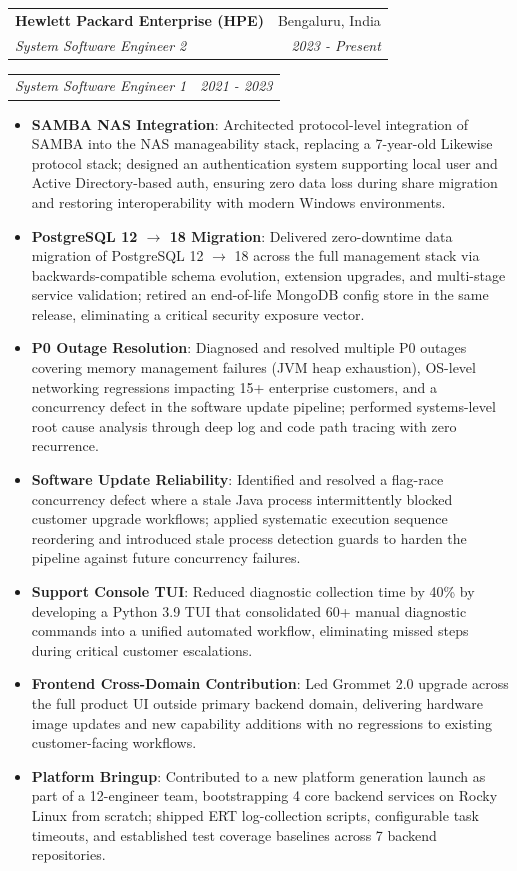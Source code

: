 \documentclass[letterpaper,10pt]{article}
\makeatletter
\newcommand{\resumeItem}[2]{
  \item\small{
    \textbf{#1}{: #2 \vspace{-2pt}}
  }
}
\newcommand{\resumeSubheading}[4]{
  \vspace{-1pt}\item
    \begin{tabular*}{0.97\textwidth}[t]{l@{\extracolsep{\fill}}r}
      \textbf{#1} & \small #2 \\
      \textit{\small #3} & \textit{\small #4} \\
    \end{tabular*}\vspace{-5pt}
}
\newcommand{\resumeSubSubheading}[2]{
    \begin{tabular*}{0.97\textwidth}{l@{\extracolsep{\fill}}r}
      \textit{\small #1} & \textit{\small #2} \\
    \end{tabular*}\vspace{-5pt}
}
\newcommand{\resumeItemListStart}{\begin{itemize}[itemsep=1pt]}
\newcommand{\resumeItemListEnd}{\end{itemize}\vspace{-3pt}}
\makeatother
\begin{document}
    \resumeSubheading
      {Hewlett Packard Enterprise (HPE)}{Bengaluru, India}
      {System Software Engineer 2}{2023 - Present}
    \resumeSubSubheading
      {System Software Engineer 1}{2021 - 2023}
      \resumeItemListStart
        \resumeItem{SAMBA NAS Integration}
          {Architected protocol-level integration of SAMBA into the NAS manageability stack, replacing a 7-year-old Likewise protocol stack; designed an authentication system supporting local user and Active Directory-based auth, ensuring zero data loss during share migration and restoring interoperability with modern Windows environments.}
        \resumeItem{PostgreSQL 12 $\rightarrow$ 18 Migration}
          {Delivered zero-downtime data migration of PostgreSQL 12 $\rightarrow$ 18 across the full management stack via backwards-compatible schema evolution, extension upgrades, and multi-stage service validation; retired an end-of-life MongoDB config store in the same release, eliminating a critical security exposure vector.}
        \resumeItem{P0 Outage Resolution}
          {Diagnosed and resolved multiple P0 outages covering memory management failures (JVM heap exhaustion), OS-level networking regressions impacting 15+ enterprise customers, and a concurrency defect in the software update pipeline; performed systems-level root cause analysis through deep log and code path tracing with zero recurrence.}
        \resumeItem{Software Update Reliability}
          {Identified and resolved a flag-race concurrency defect where a stale Java process intermittently blocked customer upgrade workflows; applied systematic execution sequence reordering and introduced stale process detection guards to harden the pipeline against future concurrency failures.}
        \resumeItem{Support Console TUI}
          {Reduced diagnostic collection time by 40\% by developing a Python 3.9 TUI that consolidated 60+ manual diagnostic commands into a unified automated workflow, eliminating missed steps during critical customer escalations.}
        \resumeItem{Frontend Cross-Domain Contribution}
          {Led Grommet 2.0 upgrade across the full product UI outside primary backend domain, delivering hardware image updates and new capability additions with no regressions to existing customer-facing workflows.}
        \resumeItem{Platform Bringup}
          {Contributed to a new platform generation launch as part of a 12-engineer team, bootstrapping 4 core backend services on Rocky Linux from scratch; shipped ERT log-collection scripts, configurable task timeouts, and established test coverage baselines across 7 backend repositories.}
      \resumeItemListEnd
\end{document}
